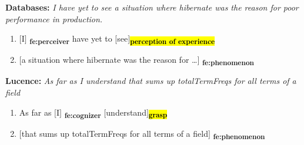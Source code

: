 
\medskip
\begin{scriptsize}
\noindent \textbf{Databases:} \textit{I have yet to see a situation where hibernate was the reason for poor performance in production.}
{\ttfamily%
\begin{enumerate}[itemindent=0.5em,leftmargin=0.5em]
\item[] $\big[$I$\big]$\textsubscript{\color{rufous} \textbf{fe:perceiver}} have yet to $\big[$see$\big]$\textsubscript{\hl{\textbf{perception of experience}}} 

\item[] $\big[$a situation where hibernate was the reason for \dots$\big]$\textsubscript{\color{rufous} \textbf{fe:phenomenon}}
\end{enumerate}
}%

\smallskip
\noindent \textbf{Lucence:} \textit{As far as I understand that sums up totalTermFreqs for all terms of a field}
{\ttfamily%
\begin{enumerate}[itemindent=0.5em,leftmargin=0.5em]
\item[] As far as $\big[$I$\big]$\textsubscript{\color{rufous} \textbf{fe:cognizer}} $\big[$understand$\big]$\textsubscript{\hl{\textbf{grasp}}} 

\item[] $\big[$that sums up totalTermFreqs for all terms of a field$\big]$\textsubscript{\color{rufous} \textbf{fe:phenomenon}}
\end{enumerate}
}%
\end{scriptsize}

\medskip

